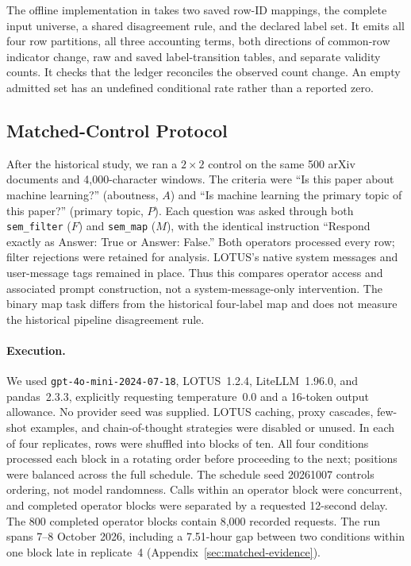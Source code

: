 \documentclass[11pt]{article}
\begin{document}
The offline implementation in  takes two saved
row-ID mappings, the complete input universe, a shared disagreement rule,
and the declared label set. It emits all four row partitions, all three
accounting terms, both directions of common-row indicator change, raw and
saved label-transition tables, and separate validity counts. It checks that
the ledger reconciles the observed count change. An empty admitted set has
an undefined conditional rate rather than a reported zero.

\subsection{Matched-Control Protocol}
\label{sec:matched-methods}

After the historical study, we ran a $2\times2$ control on the same 500
arXiv documents and 4,000-character windows. The criteria were ``Is this
paper about machine learning?'' (aboutness, $A$) and ``Is machine learning
the primary topic of this paper?'' (primary topic, $P$). Each question was
asked through both \texttt{sem\_filter} ($F$) and \texttt{sem\_map} ($M$),
with the identical instruction ``Respond exactly as Answer: True or
Answer: False.'' Both operators processed every row; filter rejections
were retained for analysis. LOTUS's native system messages and user-message
tags remained in place. Thus this compares operator access and associated
prompt construction, not a system-message-only intervention. The binary map
task differs from the historical four-label map and does not measure the
historical pipeline disagreement rule.

\paragraph{Execution.}
We used \texttt{gpt-4o-mini-2024-07-18}, LOTUS~1.2.4, LiteLLM~1.96.0, and
pandas~2.3.3, explicitly requesting temperature~0.0 and a 16-token output
allowance. No provider seed was supplied. LOTUS caching, proxy cascades,
few-shot examples, and chain-of-thought strategies were disabled or unused.
In each of four replicates, rows were shuffled into blocks of ten. All four
conditions processed each block in a rotating order before proceeding to the
next; positions were balanced across the full schedule. The schedule seed
20261007 controls ordering, not model randomness. Calls within an operator
block were concurrent, and completed operator blocks were separated by a
requested 12-second delay. The 800 completed operator blocks contain 8,000
recorded requests. The run spans 7--8 October 2026, including a 7.51-hour gap
between two conditions within one block late in replicate~4
(Appendix~\ref{sec:matched-evidence}).
\end{document}
